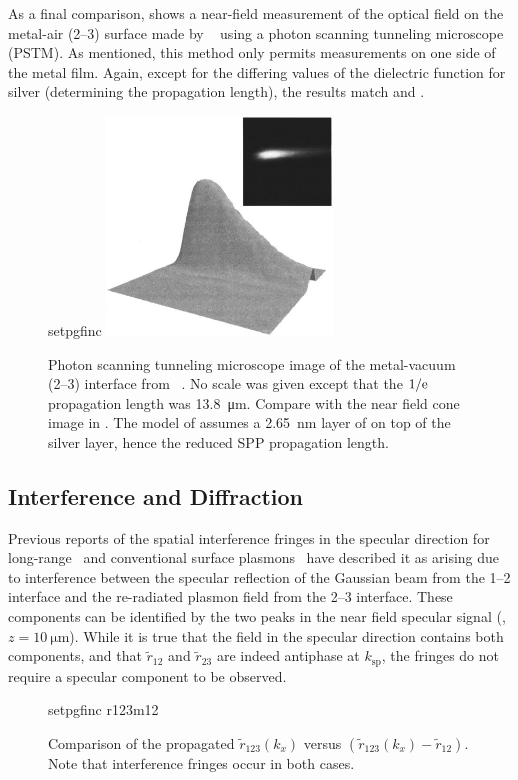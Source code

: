 As a final comparison,  shows a near-field
measurement of the optical field on the metal-air (2--3) surface made by
~\cite{dawson2001surface} using a photon scanning tunneling
microscope (PSTM).  As mentioned, this method only permits measurements on one
side of the metal film.  Again, except for the differing values of the
dielectric function for silver (determining the propagation length), the
results match  and .
\begin{figure}[ht]
\centering
{setpgfinc}
\includegraphics[keepaspectratio,width=6cm]{interference/figures/DawsonTransmitted.png}
\caption{Photon scanning tunneling microscope image of the metal-vacuum (2--3)
				interface from ~\cite{dawson2001surface}.  No scale was
				given except that the $1/{\mathrm{e}}$ propagation length was
				\SI{13.8}{\micro\meter}.  Compare with
				the near field cone image in .  The model of
				 assumes a \SI{2.65}{\nano\meter} layer of  on
				top of the silver layer, hence the reduced SPP propagation length.}
\label{fig:dawsoncompare}
\end{figure}


\subsection{Interference and Diffraction}
Previous reports of the spatial interference fringes in the specular direction
for long-range~\cite{simon2007observation} and conventional surface
plasmons~\cite{schumann2008near} have described it as arising due to
interference between the specular reflection of the Gaussian beam from the
1--2 interface and the re-radiated plasmon field from the 2--3 interface.
These components can be identified by the two peaks in the near field specular
signal (, $z=\SI{10}{\micro\meter}$).  While it is
true that the field in the specular direction contains both components, and
that $\tilde{r}_{12}$ and $\tilde{r}_{23}$ are indeed antiphase at
$k_\text{sp}$, the fringes do not require a specular component to be observed.
\begin{figure}[ht]
\centering
{setpgfinc}
{r123m12}
\caption{Comparison of the propagated $\tilde{r}_{123}(k_x)$ versus
$(\tilde{r}_{123}(k_x)-\tilde{r}_{12})$.  Note that interference fringes occur in
both cases.  }
\label{fig:r123m12}
\end{figure}

